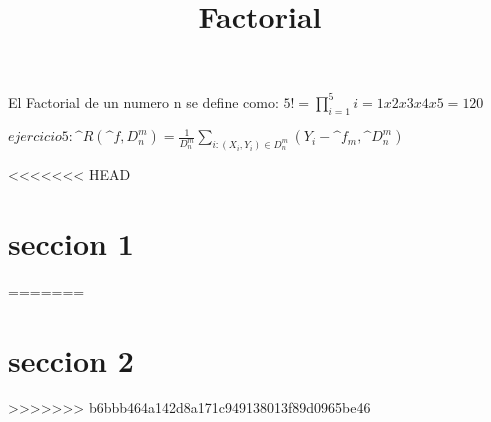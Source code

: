 \documentclass[a4paper]{article}
\title{Factorial}
\begin{document}
	\maketitle
El Factorial de un numero n se define como: $5! = \prod_{i=1}^{5} i = 1x2x3x4x5 = 120$


$ejercicio 5: \^{R}(\^{f},D^{m}_{n}) = \frac{1}{D^{m}_{n}} \sum_{i:(X_{i},Y_{i}) \in D_{n}^{m}}(Y_{i}- \^{f}_{m},\^{D}_{n}^{m}) $

<<<<<<< HEAD
\section{seccion 1}
=======
\section{seccion 2}
>>>>>>> b6bbb464a142d8a171c949138013f89d0965be46
\end{document}
